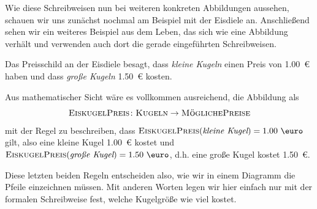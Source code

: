 \documentclass[../../main.tex]{subfiles}
\begin{document}
Wie diese Schreibweisen nun bei weiteren konkreten Abbildungen aussehen, schauen wir uns zunächst nochmal am Beispiel mit der Eisdiele an. Anschließend sehen wir ein weiteres Beispiel aus dem Leben, das sich wie eine Abbildung verhält und verwenden auch dort die gerade eingeführten Schreibweisen.

\begin{example}{}
    Das Preisschild an der Eisdiele besagt, dass \emph{kleine Kugeln} einen Preis von 1.00~\euro{} haben und dass \emph{große Kugeln} 1.50~\euro{} kosten. 
    
    Aus mathematischer Sicht wäre es vollkommen ausreichend, die Abbildung als \[\textsc{EiskugelPreis}\colon\textsc{Kugeln}\rightarrow\textsc{MöglichePreise}\] 
    mit der Regel zu beschreiben, dass $\textsc{EiskugelPreis}(\textit{kleine Kugel})=\text{1.00 \euro}$ gilt, also eine kleine Kugel 1.00~\euro{} kostet und $\textsc{EiskugelPreis}(\textit{große Kugel})=\text{1.50 \euro}$, d.h. eine große Kugel kostet 1.50~\euro. 
    
    Diese letzten beiden Regeln entscheiden also, wie wir in einem Diagramm die Pfeile einzeichnen müssen. Mit anderen Worten legen wir hier einfach nur mit der formalen Schreibweise fest, welche Kugelgröße wie viel kostet.
\end{example}
\end{document}
